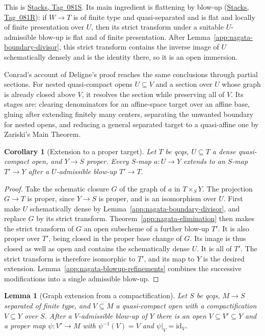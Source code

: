 \documentclass[11pt,a4paper]{article}
\numberwithin{equation}{section}
\newtheorem{lemma}[theorem]{Lemma}
\newtheorem{corollary}[theorem]{Corollary}
\theoremstyle{definition}
\theoremstyle{remark}
\newcommand{\stacks}[1]{\href{https://stacks.math.columbia.edu/tag/#1}{\textnormal{Stacks, Tag~#1}}}
\begin{document}
This is \stacks{081S}. Its main ingredient is flattening by blow-up
(\stacks{081R}): if $W\to T$ is of finite type and quasi-separated and
is flat and locally of finite presentation over $U$, then its strict
transform under a suitable $U$-admissible blow-up is flat and of
finite presentation. After Lemma~\ref{app:nagata-boundary-divisor},
this strict transform contains the inverse image of $U$ schematically
densely and is the identity there, so it is an open immersion.

Conrad's account of Deligne's proof \cite[Theorem~2.4]{ConradNagata}
reaches the same conclusions through partial sections. For nested
quasi-compact opens $U\subseteq V$ and a section over $U$ whose graph
is already closed above $V$, it resolves the section while preserving
all of $V$. Its stages are: clearing denominators for an affine-space
target over an affine base, gluing after extending finitely many
centers, separating the unwanted boundary for nested opens, and
reducing a general separated target to a quasi-affine one by Zariski's
Main Theorem.

\begin{corollary}[Extension to a proper target]
\label{app:nagata-proper-extension}
Let $T$ be qcqs, $U\subseteq T$ a dense quasi-compact open, and
$Y\to S$ proper. Every $S$-map $a:U\to Y$ extends to an $S$-map
$T'\to Y$ after a $U$-admissible blow-up $T'\to T$.
\end{corollary}

\begin{proof}
Take the schematic closure $G$ of the graph of $a$ in $T\times_SY$.
The projection $G\to T$ is proper, since $Y\to S$ is proper, and
is an isomorphism over $U$. First make $U$ schematically dense by
Lemma~\ref{app:nagata-boundary-divisor}, and replace $G$ by its strict
transform. Theorem~\ref{app:nagata-elimination} then makes the strict
transform of $G$ an open subscheme of a further blow-up $T'$.
It is also proper over $T'$, being closed in the proper base change
of $G$. Its image is thus closed as well as open and contains the
schematically dense $U$. It is all of $T'$. The strict transform is
therefore isomorphic to $T'$, and its map to $Y$ is the desired
extension. Lemma~\ref{app:nagata-blowup-refinements} combines the
successive modifications into a single admissible blow-up.
\end{proof}

\begin{lemma}[Graph extension from a compactification]
\label{app:nagata-graph-extension}
Let $S$ be qcqs, $M\to S$ separated of finite type, and
$V\subseteq M$ a quasi-compact open with a compactification
$V\subseteq Y$ over $S$. After a $V$-admissible blow-up of $Y$
there is an open $V\subseteq V'\subseteq Y$ and a proper map
$\psi:V'\to M$ with $\psi^{-1}(V)=V$ and $\psi|_V=\mathrm{id}_V$.
\end{lemma}
\end{document}
